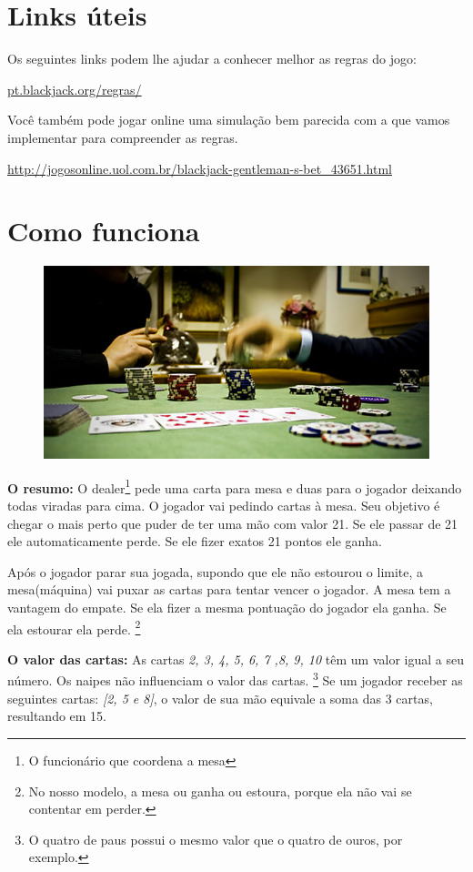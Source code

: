 \documentclass[12pt]{article}
\newcommand{\ita}[1]{\textit{#1}}  %
\newcommand{\note}[1]{\footnote{#1}} %
\newcommand{\caps}[1]{\textbf{#1}} %
\begin{document}
\section{Links úteis}
Os seguintes links podem lhe ajudar a conhecer melhor as regras do jogo:

\url{pt.blackjack.org/regras/} 

Você também pode jogar online uma simulação bem parecida com a que vamos implementar para compreender as regras.

\url{http://jogosonline.uol.com.br/blackjack-gentleman-s-bet_43651.html}
\section{Como funciona}

\begin{figure}[h]
	\centering
	\includegraphics{imagens/mesa}
\end{figure}


\caps{O resumo:} O dealer\note{O funcionário que coordena a mesa} pede uma carta para mesa e duas para o jogador deixando todas viradas para cima. O jogador vai pedindo cartas à mesa. Seu objetivo é chegar o mais perto que puder de ter uma mão com valor 21. Se ele passar de 21 ele automaticamente perde. Se ele fizer exatos 21 pontos ele ganha. 

Após o jogador parar sua jogada, supondo que ele não estourou o limite, a mesa(máquina) vai puxar as cartas para tentar vencer o jogador. A mesa tem a vantagem do empate. Se ela fizer a mesma pontuação do jogador ela ganha. Se ela estourar ela perde. \note{No nosso modelo, a mesa ou ganha ou estoura, porque ela não vai se contentar em perder.}

\caps{O valor das cartas:} As cartas \ita{2, 3, 4, 5, 6, 7 ,8, 9, 10} têm um valor igual a seu número. Os naipes não influenciam o valor das cartas.
\note{O quatro de paus possui o mesmo valor que o quatro de ouros, por exemplo.} 
Se um jogador receber as seguintes cartas: \ita{[2, 5 e 8]}, o valor de sua mão equivale a soma das 3 cartas, resultando em 15. 
\end{document}
